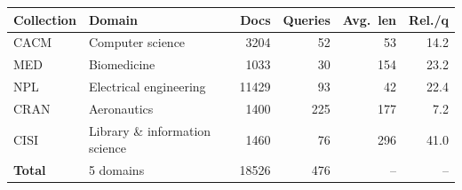 \begin{tabular}{llrrrr}
\toprule
Collection & Domain & Docs & Queries & Avg.\ len & Rel./q \\
\midrule
CACM & Computer science & 3204 & 52 & 53 & 14.2 \\
MED & Biomedicine & 1033 & 30 & 154 & 23.2 \\
NPL & Electrical engineering & 11429 & 93 & 42 & 22.4 \\
CRAN & Aeronautics & 1400 & 225 & 177 & 7.2 \\
CISI & Library \& information science & 1460 & 76 & 296 & 41.0 \\
\midrule
\textbf{Total} & 5 domains & 18526 & 476 & -- & -- \\
\bottomrule
\end{tabular}
